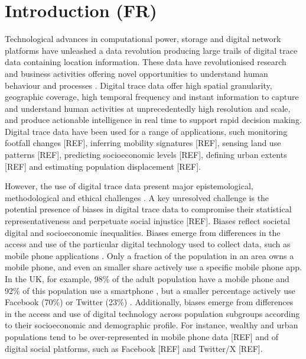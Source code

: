 \documentclass[]{rsos}%
\begin{document}
\newpage

\hypertarget{introduction-fr}{%
\section{Introduction (FR)}\label{introduction-fr}}

Technological advances in computational power, storage and digital
network platforms have unleashed a data revolution producing large
trails of digital trace data containing location information. These data
have revolutionised research and business activities offering novel
opportunities to understand human behaviour and processes
\citep{rowe23-bigdata}. Digital trace data offer high spatial granularity,
geographic coverage, high temporal frequency and instant information to
capture and understand human activities at unprecedentedly high
resolution and scale, and produce actionable intelligence in real time
to support rapid decision making. Digital trace data have been used for
a range of applications, such monitoring footfall changes {[}REF{]},
inferring mobility signatures {[}REF{]}, sensing land use patterns {[}REF{]},
predicting socioeconomic levels {[}REF{]}, defining urban extents {[}REF{]} and
estimating population displacement {[}REF{]}.

However, the use of digital trace data present major epistemological,
methodological and ethical challenges \citep{rowe23-bigdata}. A key
unresolved challenge is the potential presence of biases in digital
trace data to compromise their statistical representativeness and
perpetuate social injustice {[}REF{]}. Biases reflect societal digital and
socioeconomic inequalities. Biases emerge from differences in the access
and use of the particular digital technology used to collect data, such
as mobile phone applications \citep{wesolowski13-biases}. Only a fraction of
the population in an area owns a mobile phone, and even an smaller share
actively use a specific mobile phone app. In the UK, for example, 98\% of
the adult population have a mobile phone and 92\% of this population use
a smartphone \citep{ofcom23}, but a smaller percentage actively use Facebook
(70\%) or Twitter (23\%) \citep{statista24}. Additionally, biases emerge from
differences in the access and use of digital technology across
population subgroups according to their socioeconomic and demographic
profile. For instance, wealthy and urban populations tend to be
over-represented in mobile phone data {[}REF{]} and of digital social
platforms, such as Facebook {[}REF{]} and Twitter/X {[}REF{]}.
\end{document}
